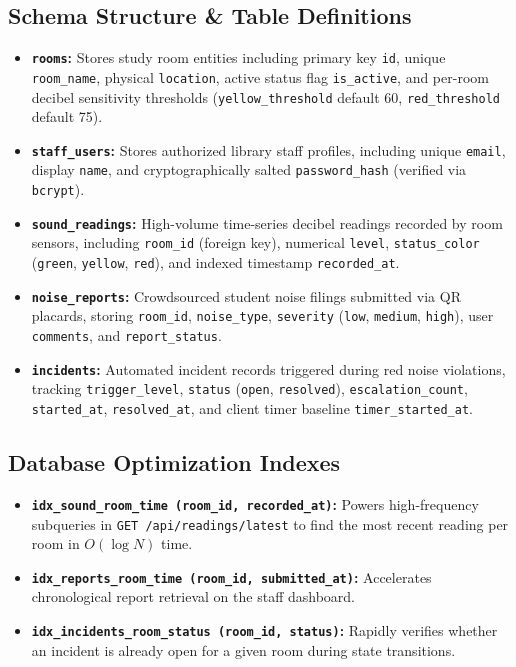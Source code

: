 \documentclass[11pt,a4paper]{article}
\begin{document}
\subsection{Schema Structure \& Table Definitions}
\begin{itemize}[leftmargin=*]
    \item \textbf{\texttt{rooms}:} Stores study room entities including primary key \texttt{id}, unique \texttt{room_name}, physical \texttt{location}, active status flag \texttt{is_active}, and per-room decibel sensitivity thresholds (\texttt{yellow_threshold} default 60, \texttt{red_threshold} default 75).
    \item \textbf{\texttt{staff_users}:} Stores authorized library staff profiles, including unique \texttt{email}, display \texttt{name}, and cryptographically salted \texttt{password_hash} (verified via \texttt{bcrypt}).
    \item \textbf{\texttt{sound_readings}:} High-volume time-series decibel readings recorded by room sensors, including \texttt{room_id} (foreign key), numerical \texttt{level}, \texttt{status_color} (\texttt{green}, \texttt{yellow}, \texttt{red}), and indexed timestamp \texttt{recorded_at}.
    \item \textbf{\texttt{noise_reports}:} Crowdsourced student noise filings submitted via QR placards, storing \texttt{room_id}, \texttt{noise_type}, \texttt{severity} (\texttt{low}, \texttt{medium}, \texttt{high}), user \texttt{comments}, and \texttt{report_status}.
    \item \textbf{\texttt{incidents}:} Automated incident records triggered during red noise violations, tracking \texttt{trigger_level}, \texttt{status} (\texttt{open}, \texttt{resolved}), \texttt{escalation_count}, \texttt{started_at}, \texttt{resolved_at}, and client timer baseline \texttt{timer_started_at}.
\end{itemize}

\subsection{Database Optimization Indexes}
\begin{itemize}[leftmargin=*]
    \item \textbf{\texttt{idx\_sound\_room\_time (room\_id, recorded\_at)}:} Powers high-frequency subqueries in \texttt{GET /api/readings/latest} to find the most recent reading per room in $O(\log N)$ time.
    \item \textbf{\texttt{idx\_reports\_room\_time (room\_id, submitted\_at)}:} Accelerates chronological report retrieval on the staff dashboard.
    \item \textbf{\texttt{idx\_incidents\_room\_status (room\_id, status)}:} Rapidly verifies whether an incident is already open for a given room during state transitions.
\end{itemize}
\end{document}
